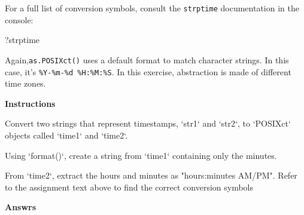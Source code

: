 \documentclass[]{article}
\newcommand{\hlnum}[1]{\textcolor[rgb]{0.816,0.125,0.439}{#1}}%
\newcommand{\hlstr}[1]{\textcolor[rgb]{0.251,0.627,0.251}{#1}}%
\newcommand{\hlcom}[1]{\textcolor[rgb]{0.502,0.502,0.502}{\textit{#1}}}%
\newcommand{\hlstd}[1]{\textcolor[rgb]{0.251,0.251,0.251}{#1}}%
\newcommand{\hlkwc}[1]{\textcolor[rgb]{0.251,0.251,0.251}{#1}}%
\newcommand{\hlkwd}[1]{\textcolor[rgb]{0.878,0.439,0.125}{#1}}%
\newenvironment{Shaded}{\begin{myshaded}}{\end{myshaded}}
\newcommand{\KeywordTok}[1]{\hlkwd{#1}}
\newcommand{\DataTypeTok}[1]{\hlkwc{#1}}
\newcommand{\DecValTok}[1]{\hlnum{#1}}
\newcommand{\StringTok}[1]{\hlstr{#1}}
\newcommand{\CommentTok}[1]{\hlcom{#1}}
\newcommand{\NormalTok}[1]{\hlstd{#1}}
\begin{document}
For a full list of conversion symbols, consult the \texttt{strptime}
documentation in the console:

\begin{Shaded}
\begin{Highlighting}[]
\NormalTok{?strptime}
\end{Highlighting}
\end{Shaded}

Again,\texttt{as.POSIXct()} uses a default format to match character
strings. In this case, it's \texttt{\%Y-\%m-\%d\ \%H:\%M:\%S}. In this
exercise, abstraction is made of different time zones.

\textbf{Instructions}

\begin{Shaded}
\begin{Highlighting}[]
\OperatorTok{*}\StringTok{ }\NormalTok{Convert two strings that represent timestamps, }\StringTok{`}\DataTypeTok{str1}\StringTok{`}\NormalTok{ and }\StringTok{`}\DataTypeTok{str2}\StringTok{`}\NormalTok{, to }\StringTok{`}\DataTypeTok{POSIXct}\StringTok{`}\NormalTok{ objects called }\StringTok{`}\DataTypeTok{time1}\StringTok{`}\NormalTok{ and }\StringTok{`}\DataTypeTok{time2}\StringTok{`}\NormalTok{.}

\OperatorTok{*}\StringTok{ }\NormalTok{Using }\StringTok{`}\DataTypeTok{format()}\StringTok{`}\NormalTok{, create a string from }\StringTok{`}\DataTypeTok{time1}\StringTok{`}\NormalTok{ containing only the minutes.}

\OperatorTok{*}\StringTok{ }\NormalTok{From }\StringTok{`}\DataTypeTok{time2}\StringTok{`}\NormalTok{, extract the hours and minutes as }\StringTok{"hours:minutes AM/PM"}\NormalTok{. Refer to the assignment text above to find the correct conversion symbols}\OperatorTok{!}
\end{Highlighting}
\end{Shaded}

\textbf{Answrs}

\begin{Shaded}
\end{Shaded}
\end{document}
